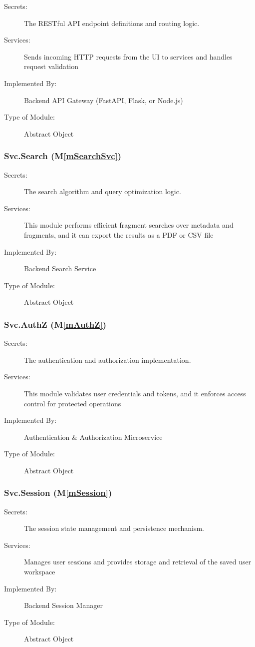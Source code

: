 \documentclass[12pt, titlepage]{article}
\newcommand{\mref}[1]{M\ref{#1}}
\begin{document}
\begin{description}
\item[Secrets:] The RESTful API endpoint definitions and routing logic.
\item[Services:] Sends incoming HTTP requests from the UI to services and handles request validation
\item[Implemented By:] Backend API Gateway (FastAPI, Flask, or Node.js)
\item[Type of Module:] Abstract Object
\end{description}

\subsubsection{Svc.Search (\mref{mSearchSvc})}

\begin{description}
\item[Secrets:] The search algorithm and query optimization logic.
\item[Services:] This module performs efficient fragment searches over metadata and fragments, and it can export the results as a PDF or CSV file
\item[Implemented By:] Backend Search Service 
\item[Type of Module:] Abstract Object
\end{description}

\subsubsection{Svc.AuthZ (\mref{mAuthZ})}

\begin{description}
\item[Secrets:] The authentication and authorization implementation.
\item[Services:] This module validates user credentials and tokens, and it enforces access control for protected operations
\item[Implemented By:] Authentication \& Authorization Microservice
\item[Type of Module:] Abstract Object
\end{description}

\subsubsection{Svc.Session (\mref{mSession})}

\begin{description}
\item[Secrets:] The session state management and persistence mechanism.
\item[Services:] Manages user sessions and provides storage and retrieval of the saved user workspace
\item[Implemented By:] Backend Session Manager
\item[Type of Module:] Abstract Object
\end{description}
\end{document}
